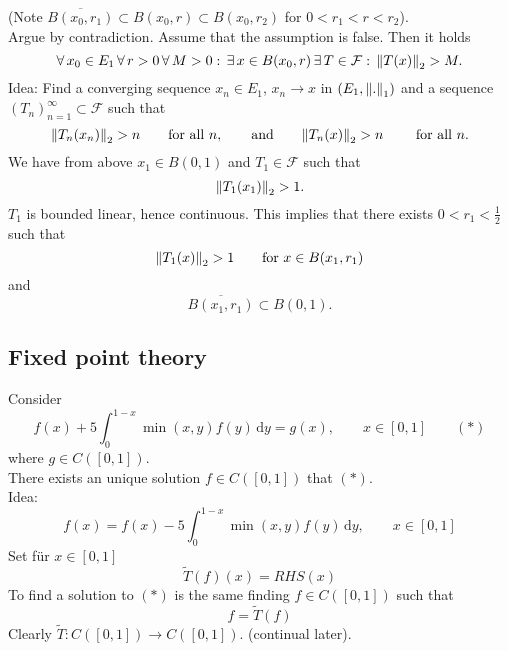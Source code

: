 \begin{beweis}
\begin{enumerate}[step 1:]
\[			\]
			(Note $\overline{B(x_0,r_1)} \subset B(x_0,r) \subset B(x_0,r_2)$ for $0 < r_1 < r < r_2$). \\
			Argue by contradiction. Assume that the assumption is false. Then it holds
			\[
				\forall\, x_0 \in E_1 \, \forall\, r >0 \,\forall\,  M>0: \,\exists\, x \in B(x_0,r) \,\exists\, T \in \mathcal{F} : \, \norm{T(x)}_2 > M.
			\]
			Idea: Find a converging sequence $x_n \in E_1$, $x_n \to x$ in $(E_1,\norm{.}_1)$ and a sequence $(T_n)_{n=1}^{\infty} \subset \mathcal{F}$ such that
			\[
				\norm{T_n(x_n)}_2 > n \qquad \text{for all }n, \qquad \text{and} \qquad \norm{T_n(x)}_2 > n \qquad \text{ for all }n.
			\]
			We have from above $x_1 \in B(0,1)$ and $T_1 \in  \mathcal{F}$ such that \[
				\norm{T_1(x_1)}_2 > 1.
			\] $T_1$ is bounded linear, hence continuous. This implies that there exists $0<r_1 < \frac{1}{2}$ such that
			\[
				\norm{T_1(x)}_2 >1 \qquad \text{for }x \in B(x_1,r_1)
			\]
			and \[
				\overline{B(x_1,r_1)}\subset B(0,1).
			\]
		\end{enumerate}
	\end{beweis}
\subsection{Fixed point theory} 
\label{sub:fixed_point_theory}
\begin{beispiel}
	Consider
	\[
		f(x)+ 5 \int_{0}^{1-x} \min(x,y)f(y) \,\mathrm{d}y = g(x), \qquad x \in [0,1] \qquad (*)
	\]
	where $g \in C([0,1])$. \\ 
	There exists an unique solution $f \in C([0,1])$ that $(*)$. \\
	Idea:
	\[
		f(x) = f(x) - 5 \int_{0}^{1-x} \min(x,y)f(y) \,\mathrm{d}y, \qquad x \in [0,1]
	\]
	Set für $x \in [0,1]$ 
	\[
			\tilde T(f)(x) = RHS(x)
	\]
	To find a solution to $(*)$ is the same finding $f \in C([0,1])$ such that 
	\[
		f = \tilde T(f)
	\]
	Clearly $ \tilde T : C([0,1]) \to C([0,1])$. (continual later).
\end{beispiel}

